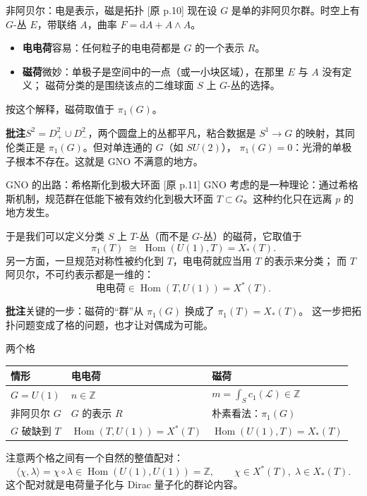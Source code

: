 \documentclass[aspectratio=169,12pt]{ctexbeamer}
\newcommand{\ZZ}{\mathbb{Z}}
\newcommand{\cL}{\mathcal{L}}
\newcommand{\dd}{\mathrm{d}}
\newcommand{\Hom}{\operatorname{Hom}}
\newcommand{\srcp}[1]{{\color{black!40}\scriptsize[原 p.#1]}}
\begin{document}
\begin{frame}{非阿贝尔：电是表示，磁是拓扑}
  \srcp{10} 现在设 $G$ 是单的非阿贝尔群。时空上有 $G$-丛 $E$，带联络 $A$，曲率
  $F=\dd A+A\wedge A$。
  \begin{itemize}
    \item \textbf{电电荷}容易：任何粒子的电电荷都是 $G$ 的一个表示 $R$。
    \item \textbf{磁荷}微妙：单极子是空间中的一点（或一小块区域），在那里 $E$ 与 $A$ 没有定义；
      磁荷分类的是围绕该点的二维球面 $S$ 上 $G$-丛的选择。
  \end{itemize}
  按这个解释，磁荷取值于 $\pi_1(G)$。
  \begin{beizhu}
  \textbf{批注}\quad $S^2=D^2_+\cup D^2_-$，两个圆盘上的丛都平凡，粘合数据是
  $S^1\to G$ 的映射，其同伦类正是 $\pi_1(G)$。但对单连通的 $G$（如 $SU(2)$），
  $\pi_1(G)=0$：光滑的单极子根本不存在。这就是 GNO 不满意的地方。
  \end{beizhu}
\end{frame}

\begin{frame}{GNO 的出路：希格斯化到极大环面}
  \srcp{11} GNO 考虑的是一种理论：通过希格斯机制，规范群在低能下被有效约化到极大环面
  $T\subset G$。这种约化只在远离 $p$ 的地方发生。
  \vspace{0.4em}

  于是我们可以定义分类 $S$ 上 $T$-丛（而不是 $G$-丛）的磁荷，它取值于
  \[
    \pi_1(T)\;\cong\;\Hom(U(1),T)=X_*(T).
  \]
  另一方面，一旦规范对称性被约化到 $T$，电电荷就应当用 $T$ 的表示来分类；
  而 $T$ 阿贝尔，不可约表示都是一维的：
  \[
    \text{电电荷}\in\Hom(T,U(1))=X^*(T).
  \]
  \begin{beizhu}
  \textbf{批注}\quad 关键的一步：磁荷的“群”从 $\pi_1(G)$ 换成了 $\pi_1(T)=X_*(T)$。
  这一步把拓扑问题变成了格的问题，也才让对偶成为可能。
  \end{beizhu}
\end{frame}

\begin{frame}{两个格}
  \begin{center}
  \renewcommand{\arraystretch}{1.25}
  \begin{tabular}{@{}lll@{}}
    \toprule
    情形 & 电电荷 & 磁荷 \\
    \midrule
    $G=U(1)$ & $n\in\ZZ$ & $m=\int_S c_1(\cL)\in\ZZ$ \\
    非阿贝尔 $G$ & $G$ 的表示 $R$ & 朴素看法：$\pi_1(G)$ \\
    $G$ 破缺到 $T$ & $\Hom(T,U(1))=X^*(T)$ & $\Hom(U(1),T)=X_*(T)$ \\
    \bottomrule
  \end{tabular}
  \end{center}
  \vspace{0.6em}
  注意两个格之间有一个自然的整值配对：
  \[
    \langle \chi,\lambda\rangle=\chi\circ\lambda\in\Hom(U(1),U(1))=\ZZ,
    \qquad \chi\in X^*(T),\;\lambda\in X_*(T).
  \]
  这个配对就是电荷量子化与 Dirac 量子化的群论内容。
\end{frame}
\end{document}
